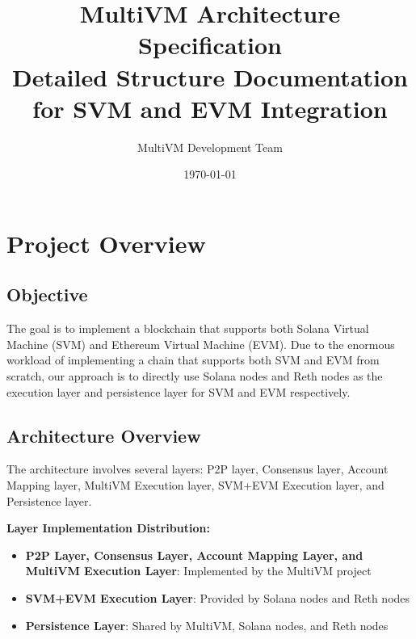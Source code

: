 \documentclass[11pt,a4paper]{article}
\title{\textbf{MultiVM Architecture Specification} \\ 
       \large{Detailed Structure Documentation for SVM and EVM Integration}}
\author{MultiVM Development Team}
\date{\today}
\begin{document}
\maketitle

\tableofcontents
\newpage

\section{Project Overview}

\subsection{Objective}
The goal is to implement a blockchain that supports both Solana Virtual Machine (SVM) and Ethereum Virtual Machine (EVM). Due to the enormous workload of implementing a chain that supports both SVM and EVM from scratch, our approach is to directly use Solana nodes and Reth nodes as the execution layer and persistence layer for SVM and EVM respectively.

\subsection{Architecture Overview}
The architecture involves several layers: P2P layer, Consensus layer, Account Mapping layer, MultiVM Execution layer, SVM+EVM Execution layer, and Persistence layer.

\textbf{Layer Implementation Distribution:}
\begin{itemize}
    \item \textbf{P2P Layer, Consensus Layer, Account Mapping Layer, and MultiVM Execution Layer}: Implemented by the MultiVM project
    \item \textbf{SVM+EVM Execution Layer}: Provided by Solana nodes and Reth nodes
    \item \textbf{Persistence Layer}: Shared by MultiVM, Solana nodes, and Reth nodes
\end{itemize}
\end{document}
